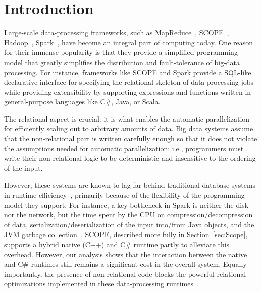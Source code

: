 \section{Introduction}
Large-scale data-processing frameworks, such as MapReduce~\cite{MapReduce}, SCOPE~\cite{SCOPE}, Hadoop~\cite{Hadoop}, Spark~\cite{Spark}, have become an integral part of computing today. One reason for their immense popularity is that they provide a simplified programming model that greatly simplifies the distribution and fault-tolerance of big-data processing. For instance, frameworks like SCOPE and Spark provide a SQL-like declarative interface for specifying the relational skeleton of data-processing jobs while providing extensibility by supporting expressions and functions written in general-purpose languages like C\#, Java, or Scala. 

The relational aspect is crucial: it is what enables the automatic parallelization for efficiently scaling out to arbitrary amounts of data.
Big data systems assume that the non-relational part is written carefully enough so that it does not violate the assumptions needed for automatic parallelization: i.e., programmers must write their non-relational logic to be deterministic and insensitive to the ordering of the input.

However, these systems are known to lag far behind traditional database systems in runtime efficiency~\cite{Jahani:2011,Pavlo:2009}, primarily because of the flexibility of the programming model they support. For instance,  a key bottleneck in Spark is neither the disk nor the network, but the time spent by the CPU on compression/decompression of data, serialization/deserialization of the input into/from Java objects, and the JVM garbage collection~\cite{ousterhout-nsdi15}. SCOPE,  described more fully in Section~\ref{sec:Scope}, supports a hybrid native (C++) and C\# runtime partly to alleviate this overhead.
However, our analysis shows that the interaction between the native and C\# runtimes still remains a significant cost in the overall system.
Equally importantly, the presence of non-relational code blocks the powerful relational optimizations implemented in these data-processing runtimes~\cite{non-relational-opt-papers}. 


